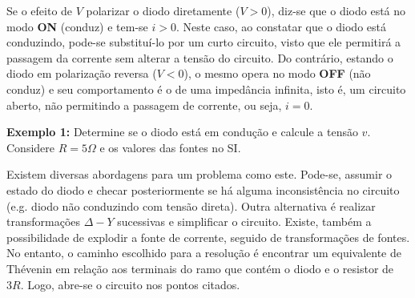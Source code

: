 \documentclass{article}
\numberwithin{equation}{section}
\begin{document}
Se o efeito de $V$ polarizar o diodo diretamente ($V>0$), diz-se que o diodo está no modo \textbf{ON} (conduz) e tem-se $i>0$. Neste caso, ao constatar que o diodo está conduzindo, pode-se substituí-lo por um curto circuito, visto que ele permitirá a passagem da corrente sem alterar a tensão do circuito. Do contrário, estando o diodo em polarização reversa ($V<0$), o mesmo opera no modo \textbf{OFF} (não conduz) e seu comportamento é o de uma impedância infinita, isto é, um circuito aberto, não permitindo a passagem de corrente, ou seja, $i=0$.

\vspace{2mm}

\textbf{Exemplo 1:} Determine se o diodo está em condução e calcule a tensão $v$. Considere $R=5\Omega$ e os valores das fontes no SI.

\begin{center}
\end{center}

\noindent Existem diversas abordagens para um problema como este. Pode-se, assumir o estado do diodo e checar posteriormente se há alguma inconsistência no circuito (e.g. diodo não conduzindo com tensão direta). Outra alternativa é realizar transformações $\Delta-Y$ sucessivas e simplificar o circuito. Existe, também a possibilidade de explodir a fonte de corrente, seguido de transformações de fontes. No entanto, o caminho escolhido para a resolução é encontrar um equivalente de Thévenin em relação aos terminais do ramo que contém o diodo e o resistor de $3R$. Logo, abre-se o circuito nos pontos citados.

\begin{center}
\end{center}
\end{document}
